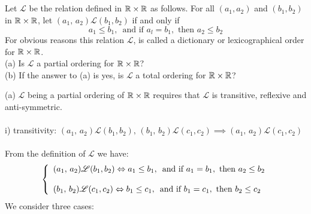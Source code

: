 \subsection{}
\begin{tcolorbox}
Let $\mathscr{L}$  be the relation defined in $\mathbb{R}\times\mathbb{R}$ as follows. For all $(a_1, a_2)$ and $(b_1, b_2)$ in $\mathbb{R}\times\mathbb{R}$, let $(a_1,\, a_2)\mathscr{L} (b_1, b_2)$ if and only if 
$$a_1\leq b_1,\,\text{ and if } a_l = b_1, \text{ then } a_2\leq b_2$$ For obvious reasons this relation $\mathscr{L}$, is called a dictionary or lexicographical order for $\mathbb{R}\times\mathbb{R}$.\\
(a) Is $\mathscr{L}$ a partial ordering for $\mathbb{R}\times\mathbb{R}$?\\
(b) If the answer to (a) is yes, is $\mathscr{L}$  a total ordering for $\mathbb{R}\times\mathbb{R}$? 
\end{tcolorbox}
$$ $$
(a) $\mathscr{L}$ being a partial ordering of $\mathbb{R}\times \mathbb{R}$ requires that $\mathscr{L}$ is transitive, reflexive and anti-symmetric.\\\\
i) transitivity:  $(a_1,\, a_2)\mathscr{L} (b_1, b_2),\, (b_1,\, b_2)\mathscr{L} (c_1, c_2)\implies (a_1,\, a_2)\mathscr{L} (c_1, c_2)$\\\\
 From the definition of $\mathscr{L}$ we have:\\
 \begin{align*}\left\{\begin{array}{l}(a_1,\, a_2)\mathscr{L} (b_1, b_2)\Leftrightarrow a_1\leq b_1,\,\text{ and if } a_1 = b_1, \text{ then } a_2\leq b_2\\\\
 (b_1,\, b_2)\mathscr{L} (c_1, c_2)\Leftrightarrow b_1\leq c_1,\,\text{ and if } b_1 = c_1, \text{ then } b_2\leq c_2
 \end{array}\right.
 \end{align*}
 We consider three cases:\\\\

